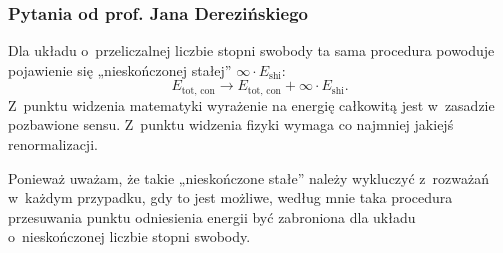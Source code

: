 \documentclass[10pt,t]{beamer}
\begin{document}
\begin{frame}
  \frametitle{Pytania od prof. Jana Derezińskiego}










  Dla układu o~przeliczalnej liczbie stopni swobody ta sama
  procedura powoduje pojawienie się „nieskończonej stałej”
  $\infty \cdot E_{ \text{shi} }$:
  \begin{equation}
    \label{eq:Algebraiczne-podejscie-ETC-01}
    E_{ \text{tot, con} } \to E_{ \text{tot, con} } + \infty \cdot E_{ \text{shi} }.
  \end{equation}
  Z~punktu widzenia matematyki wyrażenie na energię całkowitą jest
  w~zasadzie pozbawione sensu. Z~punktu widzenia fizyki wymaga co najmniej
  jakiejś renormalizacji.

  Ponieważ uważam, że takie „nieskończone stałe” należy wykluczyć
  z~rozważań w~każdym przypadku, gdy to jest możliwe, według mnie taka
  procedura przesuwania punktu odniesienia energii być zabroniona dla układu
  o~nieskończonej liczbie stopni swobody.

\end{frame}
\end{document}

